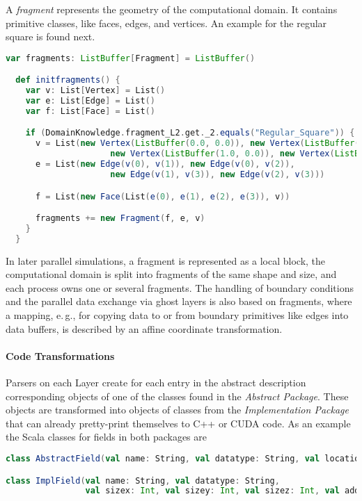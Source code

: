 \documentclass[onecolumn]{svjour3}
\begin{document}
A \textit{fragment} represents the geometry of the computational domain. It contains primitive classes, like faces, edges, and vertices. An example for the regular square is found next. 
          
\begin{minipage}{\textwidth}
\begin{lstlisting}[language=Scala]
  var fragments: ListBuffer[Fragment] = ListBuffer()

  def initfragments() {
    var v: List[Vertex] = List()
    var e: List[Edge] = List()
    var f: List[Face] = List()

    if (DomainKnowledge.fragment_L2.get._2.equals("Regular_Square")) {
      v = List(new Vertex(ListBuffer(0.0, 0.0)), new Vertex(ListBuffer(0.0, 1.0)), 
			         new Vertex(ListBuffer(1.0, 0.0)), new Vertex(ListBuffer(1.0, 1.0)))
      e = List(new Edge(v(0), v(1)), new Edge(v(0), v(2)), 
			         new Edge(v(1), v(3)), new Edge(v(2), v(3)))

      f = List(new Face(List(e(0), e(1), e(2), e(3)), v))

      fragments += new Fragment(f, e, v)
    }
  }
\end{lstlisting}
\end{minipage}

In later parallel simulations, a fragment is represented as a local block, the computational domain is split into fragments of the same shape and size, and each process owns one or several fragments.
The handling of boundary conditions and the parallel data exchange via ghost layers is also based on fragments, where a mapping, e.\,g., for copying data to or from boundary primitives like edges into data buffers, is described by an affine coordinate transformation.



\paragraph{Code Transformations}

Parsers on each Layer create for each entry in the abstract description corresponding objects of one of the classes found in the \textit{Abstract Package}. These objects are transformed into objects of classes from the \textit{Implementation Package} that can already pretty-print themselves to C++ or CUDA code.  
As an example the Scala classes for fields in both packages are

\begin{minipage}{\textwidth}
\begin{lstlisting}[language=Scala]
class AbstractField(val name: String, val datatype: String, val location: String)

class ImplField(val name: String, val datatype: String, 
                val sizex: Int, val sizey: Int, val sizez: Int, val addpoints: Int)
\end{lstlisting}
\end{minipage}
\end{document}
